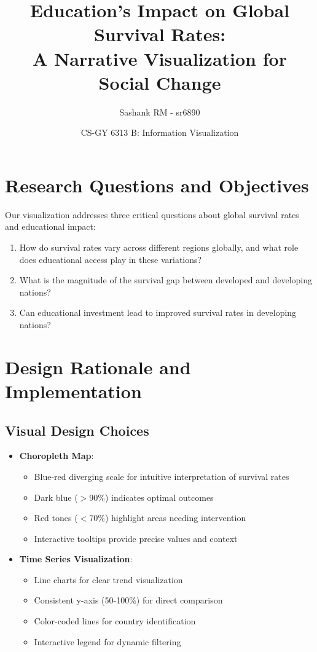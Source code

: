 \documentclass{article}
\title{Education's Impact on Global Survival Rates: \\ A Narrative Visualization for Social Change}
\author{Sashank RM - sr6890}
\date{CS-GY 6313 B: Information Visualization}
\begin{document}
\maketitle

\section{Research Questions and Objectives}
Our visualization addresses three critical questions about global survival rates and educational impact:

\begin{enumerate}[label=\textbf{Q\arabic*.}]
    \item How do survival rates vary across different regions globally, and what role does educational access play in these variations?
    \item What is the magnitude of the survival gap between developed and developing nations?
    \item Can educational investment lead to improved survival rates in developing nations?
\end{enumerate}

\section{Design Rationale and Implementation}
\subsection{Visual Design Choices}
\begin{itemize}
    \item \textbf{Choropleth Map}:
        \begin{itemize}
            \item Blue-red diverging scale for intuitive interpretation of survival rates
            \item Dark blue ($>$90\%) indicates optimal outcomes
            \item Red tones ($<$70\%) highlight areas needing intervention
            \item Interactive tooltips provide precise values and context
        \end{itemize}
    \item \textbf{Time Series Visualization}:
        \begin{itemize}
            \item Line charts for clear trend visualization
            \item Consistent y-axis (50-100\%) for direct comparison
            \item Color-coded lines for country identification
            \item Interactive legend for dynamic filtering
        \end{itemize}
\end{itemize}
\end{document}
